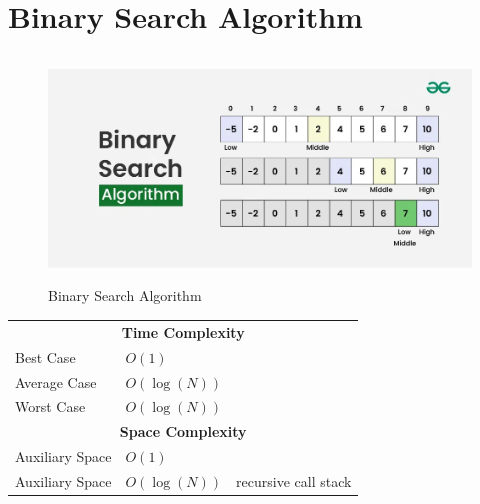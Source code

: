 \section{Binary Search Algorithm \cite{gfg-binary-search}} \label{Binary Search Algorithm}

\begin{table}[H]
    \begin{minipage}[t]{0.45\linewidth}
        \begin{figure}[H]
            \centering
            \includegraphics[width=\linewidth,height=6cm,keepaspectratio]{Pictures/ds-algo/binnary-search.jpg}
            \caption{Binary Search Algorithm}
        \end{figure}
    \end{minipage}
    \hfill
    \begin{minipage}[t]{0.55\linewidth}
        \begin{table}[H]
            \begin{tabular}{l l p{4cm}}
                \multicolumn{3}{c}{\textbf{Time Complexity}} \\
                 Best Case & $O(1)$ & \\
                 Average Case & $O(\log(N))$ &  \\
                 Worst Case & $O(\log(N))$ &  \\
                 \multicolumn{3}{c}{\textbf{Space Complexity}}\\
                 Auxiliary Space & $O(1)$ & \\
                 Auxiliary Space & $O(\log(N))$ & recursive call stack \\
            \end{tabular}
        \end{table}
    \end{minipage}
\end{table}


